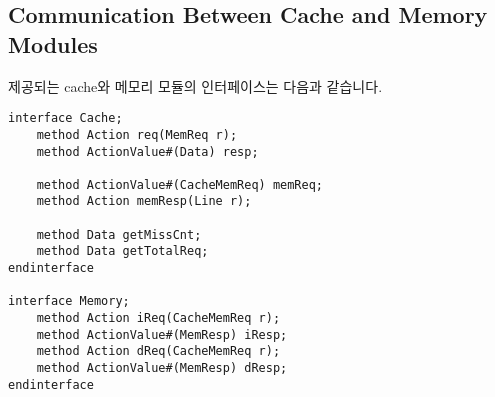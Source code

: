 \documentclass{article}
\begin{document}
\subsection{Communication Between Cache and Memory Modules}
제공되는 cache와 메모리 모듈의 인터페이스는 다음과 같습니다.

\begin{Verbatim}[frame=single]
interface Cache;
	method Action req(MemReq r);
	method ActionValue#(Data) resp;

  	method ActionValue#(CacheMemReq) memReq;
  	method Action memResp(Line r);
	
	method Data getMissCnt;
	method Data getTotalReq;
endinterface

interface Memory;
	method Action iReq(CacheMemReq r);
	method ActionValue#(MemResp) iResp;
	method Action dReq(CacheMemReq r);
	method ActionValue#(MemResp) dResp;
endinterface
\end{Verbatim}
\end{document}
